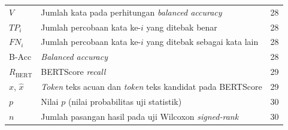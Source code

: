 \begin{longtable}{@{} l >{\raggedright\arraybackslash}p{6.5cm} c @{}}

$V$ & Jumlah kata pada perhitungan \textit{balanced accuracy} & 28 \\
$TP_i$ & Jumlah percobaan kata ke-$i$ yang ditebak benar & 28 \\
$FN_i$ & Jumlah percobaan kata ke-$i$ yang ditebak sebagai kata lain & 28 \\
B-Acc & \textit{Balanced accuracy} & 28 \\
$R_{\text{BERT}}$ & BERTScore \textit{recall} & 29 \\
$x$, $\hat{x}$ & \textit{Token} teks acuan dan \textit{token} teks kandidat pada BERTScore & 29 \\
$p$ & Nilai $p$ (nilai probabilitas uji statistik) & 30 \\
$n$ & Jumlah pasangan hasil pada uji Wilcoxon \textit{signed-rank} & 30 \\

\end{longtable}
